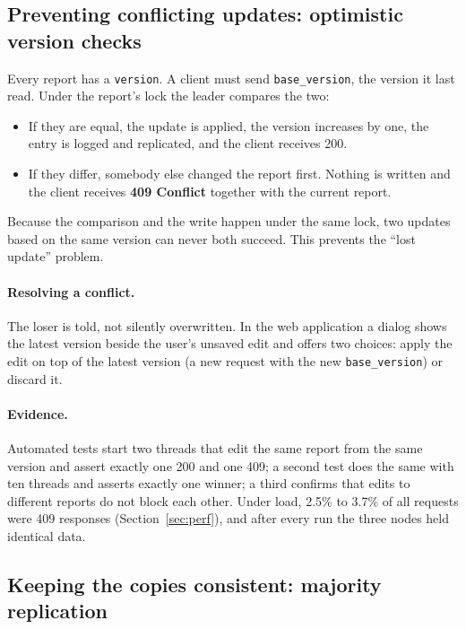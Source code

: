 \documentclass[10pt,a4paper]{article}
\newcommand{\code}[1]{\texttt{#1}}
\begin{document}
\subsection{Preventing conflicting updates: optimistic version checks}

Every report has a \code{version}. A client must send \code{base\_version}, the version it last
read. Under the report's lock the leader compares the two:

\begin{itemize}
\item If they are equal, the update is applied, the version increases by one, the entry is logged
and replicated, and the client receives 200.
\item If they differ, somebody else changed the report first. Nothing is written and the client
receives \textbf{409 Conflict} together with the current report.
\end{itemize}

Because the comparison and the write happen under the same lock, two updates based on the same
version can never both succeed. This prevents the ``lost update'' problem.

\paragraph{Resolving a conflict.} The loser is told, not silently overwritten. In the web
application a dialog shows the latest version beside the user's unsaved edit and offers two
choices: apply the edit on top of the latest version (a new request with the new
\code{base\_version}) or discard it.

\paragraph{Evidence.} Automated tests start two threads that edit the same report from the same
version and assert exactly one 200 and one 409; a second test does the same with ten threads and
asserts exactly one winner; a third confirms that edits to different reports do not block each
other. Under load, 2.5\% to 3.7\% of all requests were 409 responses (Section~\ref{sec:perf}),
and after every run the three nodes held identical data.

\subsection{Keeping the copies consistent: majority replication}
\end{document}
